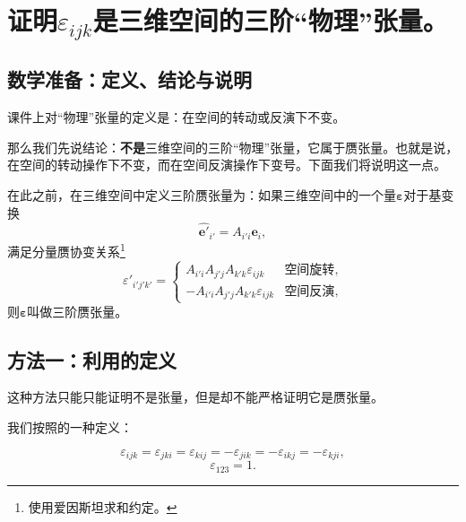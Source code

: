 \section{证明$\varepsilon_{ijk}$是三维空间的三阶“物理”张量。}

    \subsection{数学准备：定义、结论与说明}

    课件上对“物理”张量的定义是：在空间的转动或反演下不变。
    
    那么我们先说结论：\nota{\ep}\textbf{不是}三维空间的三阶“物理”张量，它属于赝张量。也就是说，\nota{\ep}在空间的转动操作下不变，而在空间反演操作下变号。下面我们将说明这一点。
    
    在此之前，在三维空间中定义三阶赝张量为：如果三维空间中的一个量$\mathbf{\varepsilon}$对于基变换
    \begin{equation}
        \mathbf{\hat{e'}}_{i'} = A_{i'i} \bm{e}_i ,
        \label{0.1_基}
    \end{equation}
    满足分量赝协变关系\footnote{使用爱因斯坦求和约定。}
    \begin{equation}
        \varepsilon'_{i'j'k'} = 
        \begin{cases}
            A_{i'i}A_{j'j}A_{k'k} \varepsilon_{ijk} & \text{空间旋转},\\
            - A_{i'i}A_{j'j}A_{k'k} \varepsilon_{ijk} & \text{空间反演},
        \end{cases}
        \label{0.1_赝}
    \end{equation}
    则$\mathbf{\varepsilon}$叫做三阶赝张量。
    
    \subsection{方法一：利用\nota{\ep}的定义}
    
        这种方法只能只能证明\nota{\ep}不是张量，但是却不能严格证明它是赝张量。
        
        我们按照\nota{\ep}的一种定义：
        
            \begin{equation}
                \varepsilon_{ijk} = \varepsilon_{jki} = \varepsilon_{kij} = -\varepsilon_{jik} = -\varepsilon_{ikj} = -\varepsilon_{kji}, \label{0.1_对称}
            \end{equation}
            \begin{equation}
                \varepsilon_{123} = 1 \label{0.1_1}.
            \end{equation}
        
